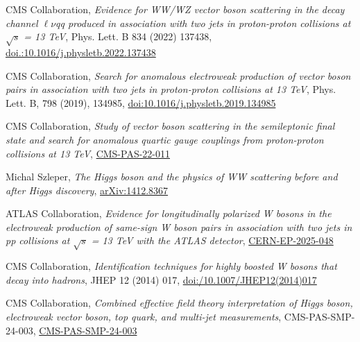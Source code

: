 {\begin{thebibliography}{9}
\bibitem{[4]}
CMS Collaboration, {\em Evidence for WW/WZ vector boson scattering in the decay channel $\ell\nu$qq produced in association with two jets in proton-proton collisions at $\sqrt{s}$ = 13 TeV}, Phys. Lett. B 834 (2022) 137438, \href{https://doi.org/10.1016/j.physletb.2022.137438}{doi.:10.1016/j.physletb.2022.137438}

\bibitem{[5]}
CMS Collaboration, {\em Search for anomalous electroweak production of vector boson pairs in association with two jets in proton-proton collisions at 13 TeV}, Phys. Lett. B, 798 (2019), 134985, \href{https://doi.org/10.1016/j.physletb.2019.134985}{doi:10.1016/j.physletb.2019.134985}

\bibitem{[6]}
CMS Collaboration, {\em Study of vector boson scattering in the semileptonic final state and search for anomalous quartic gauge couplings from proton-proton collisions at 13 TeV},  \href{https://cds.cern.ch/record/2926224}{CMS-PAS-22-011}


\bibitem{[7]}
Michal Szleper, {\em The Higgs boson and the physics of WW scattering before and after Higgs discovery}, \href{https://arxiv.org/pdf/1412.8367}{arXiv:1412.8367}

\bibitem{[8]}
ATLAS Collaboration, {\em Evidence for longitudinally polarized W bosons in the electroweak production of same-sign W boson pairs in association with two jets in pp collisions at $\sqrt{s}$ = 13 TeV with the ATLAS detector}, \href{https://arxiv.org/abs/2503.11317}{CERN-EP-2025-048}

\bibitem{[9]}
CMS Collaboration, {\em Identification techniques for highly boosted W bosons that decay into hadrons}, JHEP 12 (2014) 017, \href{https://link.springer.com/article/10.1007/JHEP12(2014)017}{doi:/10.1007/JHEP12(2014)017}

\bibitem{[10]}
CMS Collaboration, {\em Combined effective field theory interpretation of Higgs boson, electroweak vector boson, top quark, and multi-jet measurements}, CMS-PAS-SMP-24-003, \href{https://cds.cern.ch/record/2911229/}{CMS-PAS-SMP-24-003}

\end{thebibliography}
}

